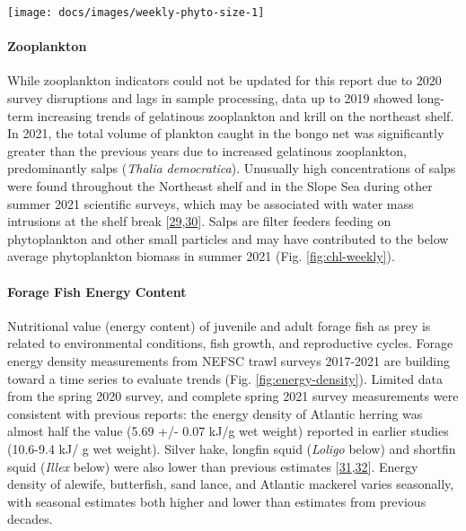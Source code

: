 \documentclass[
  10pt,
]{article}
\let\origfigure\figure
\let\endorigfigure\endfigure
\renewenvironment{figure}[1][2] {
    \expandafter\origfigure\expandafter[H]
} {
    \endorigfigure
}
\begin{document}
\begin{figure}

{\centering \texttt{[image: docs/images/weekly-phyto-size-1]} 

}

\caption{The annual climatology (1998-2020) percent composition of the phytoplankton size classes in the Mid-Atlantic bight based on satellite observations in the shaded portions.  The 2021 proportions for the microplankton (>20 microns, green) and nanoplankton (2-20 microns, orange) are shown in the bold lines.}\label{fig:weekly-phyto-size}
\end{figure}

\hypertarget{zooplankton}{%
\paragraph{Zooplankton}\label{zooplankton}}

While zooplankton indicators could not be updated for this report due to
2020 survey disruptions and lags in sample processing, data up to 2019
showed long-term increasing trends of gelatinous zooplankton and krill
on the northeast shelf. In 2021, the total volume of plankton caught in
the bongo net was significantly greater than the previous years due to
increased gelatinous zooplankton, predominantly salps (\emph{Thalia
democratica}). Unusually high concentrations of salps were found
throughout the Northeast shelf and in the Slope Sea during other summer
2021 scientific surveys, which may be associated with water mass
intrusions at the shelf break
{[}\protect\hyperlink{ref-madin_periodic_2006}{29},\protect\hyperlink{ref-deibel_predictability_2009}{30}{]}.
Salps are filter feeders feeding on phytoplankton and other small
particles and may have contributed to the below average phytoplankton
biomass in summer 2021 (Fig. \ref{fig:chl-weekly}).

\hypertarget{forage-fish-energy-content}{%
\paragraph{Forage Fish Energy
Content}\label{forage-fish-energy-content}}

Nutritional value (energy content) of juvenile and adult forage fish as
prey is related to environmental conditions, fish growth, and
reproductive cycles. Forage energy density measurements from NEFSC trawl
surveys 2017-2021 are building toward a time series to evaluate trends
(Fig. \ref{fig:energy-density}). Limited data from the spring 2020
survey, and complete spring 2021 survey measurements were consistent
with previous reports: the energy density of Atlantic herring was almost
half the value (5.69 +/- 0.07 kJ/g wet weight) reported in earlier
studies (10.6-9.4 kJ/ g wet weight). Silver hake, longfin squid
(\emph{Loligo} below) and shortfin squid (\emph{Illex} below) were also
lower than previous estimates
{[}\protect\hyperlink{ref-steimle_energy_1985}{31},\protect\hyperlink{ref-lawson_important_1998}{32}{]}.
Energy density of alewife, butterfish, sand lance, and Atlantic mackerel
varies seasonally, with seasonal estimates both higher and lower than
estimates from previous decades.
\end{document}
